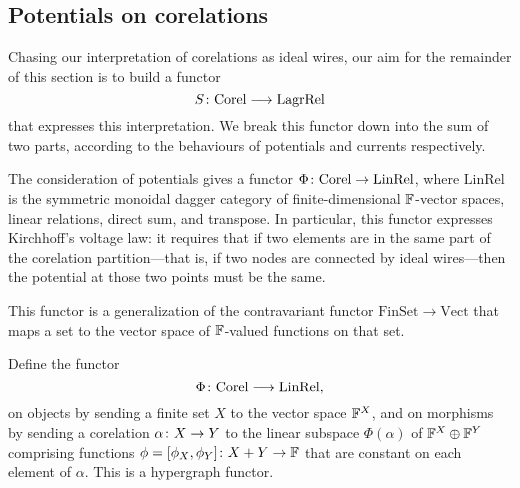 \subsection{Potentials on corelations} \label{ssec:potentialsoncorelations}

Chasing our interpretation of corelations as ideal wires, our aim for the
remainder of this section is to build a functor
\[
  S{\colon} \mathrm{Corel} \longrightarrow \mathrm{LagrRel}
\]
that expresses this interpretation. We break this functor down into the sum 
of two parts, according to the behaviours of potentials and currents
respectively. 

The consideration of potentials gives a functor $\Phi{\colon} \mathrm{Corel}
\to \mathrm{LinRel}$, where $\mathrm{LinRel}$ is the symmetric
monoidal dagger category of finite-dimensional ${\mathbb F}$-vector spaces, linear
relations, direct sum, and transpose. In particular, this functor expresses
Kirchhoff's voltage law: it requires that if two elements are in the same part
of the corelation partition---that is, if two nodes are connected by ideal
wires---then the potential at those two points must be the same.

This functor is a generalization of the
contravariant functor $\mathrm{FinSet} \to \mathrm{Vect}$ that maps a set to the
vector space of ${\mathbb F}$-valued functions on that set.

\begin{proposition}
  Define the functor 
  \[ 
    \Phi{\colon} \mathrm{Corel} \longrightarrow \mathrm{LinRel}, 
  \] 
  on objects by sending a finite set $X$ to the vector space ${\mathbb F}^X$, and on
  morphisms by sending a corelation $\alpha{\colon} X \to Y$ to the linear subspace
  $\Phi(\alpha)$ of ${\mathbb F}^X \oplus {\mathbb F}^Y$ comprising functions $\phi =
  [\phi_X,\phi_Y]{\colon} X+Y \to {\mathbb F}$ that are constant on each element of
  $\alpha$.  This is a hypergraph functor.
\end{proposition}

